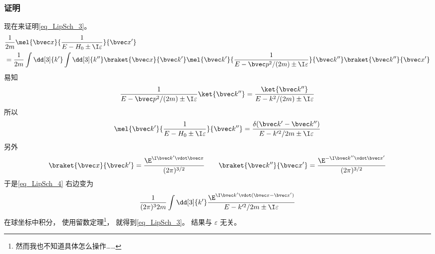 \subsubsection{证明}
现在来证明\autoref{eq_LipSch_3}。
\begin{equation}\label{eq_LipSch_4}
\begin{aligned}
&\frac{1}{2m} \mel{\bvec x}{\frac{1}{E-H_0\pm \I\varepsilon}}{\bvec x'}\\
&= \frac{1}{2m} \int \dd[3]{k'} \int \dd[3]{k''} \braket{\bvec x}{\bvec k'}\mel{\bvec k'}{\frac{1}{E-\bvec p^2/(2m)\pm \I\varepsilon}}{\bvec k''} \braket{\bvec k''}{\bvec x'}
\end{aligned}
\end{equation}
易知
\begin{equation}
\frac{1}{E-\bvec p^2/(2m)\pm \I\varepsilon}\ket{\bvec k''} = \frac{\ket{\bvec k''}}{E- k^2/(2m)\pm \I\varepsilon}
\end{equation}
所以
\begin{equation}
\mel{\bvec k'}{\frac{1}{E-H_0\pm \I\varepsilon}}{\bvec k''} = \frac{\delta(\bvec k'-\bvec k'')}{E-k'^2/2m\pm\I\varepsilon}
\end{equation}
另外
\begin{equation}
\braket{\bvec x}{\bvec k'} = \frac{\E^{\I \bvec k'\vdot \bvec x}}{(2\pi)^{3/2}}
\qquad
\braket{\bvec k''}{\bvec x'} = \frac{\E^{-\I \bvec k''\vdot \bvec x'}}{(2\pi)^{3/2}}
\end{equation}
于是\autoref{eq_LipSch_4} 右边变为
\begin{equation}
\frac{1}{(2\pi)^32m}\int\dd[3]{k'}  \frac{\E^{\I \bvec k'\vdot (\bvec x-\bvec x')}}{E-k'^2/2m\pm\I\varepsilon}
\end{equation}
在球坐标中积分， 使用留数定理\footnote{然而我也不知道具体怎么操作……}， 就得到\autoref{eq_LipSch_3}。 结果与 $\varepsilon$ 无关。
